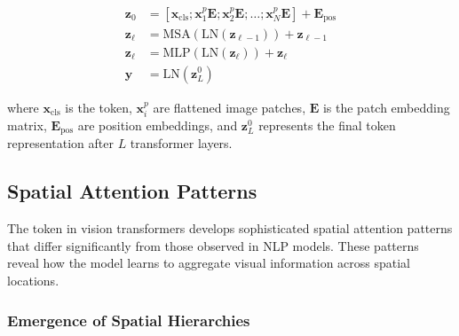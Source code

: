 \begin{align}
\mathbf{z}_0 &= [\mathbf{x}_{\text{cls}}; \mathbf{x}_1^p\mathbf{E}; \mathbf{x}_2^p\mathbf{E}; \ldots; \mathbf{x}_N^p\mathbf{E}] + \mathbf{E}_{\text{pos}} \\
\mathbf{z}_\ell &= \text{MSA}(\text{LN}(\mathbf{z}_{\ell-1})) + \mathbf{z}_{\ell-1} \\
\mathbf{z}_\ell &= \text{MLP}(\text{LN}(\mathbf{z}_\ell)) + \mathbf{z}_\ell \\
\mathbf{y} &= \text{LN}(\mathbf{z}_L^0)
\end{align}
\begin{comment}
Feedback: These equations are dense for non-experts. A brief, intuitive walkthrough would be very helpful. For example:
"Let's break this down:
1. The first line shows the input preparation: the special [CLS] token is prepended to the sequence of embedded image patches, and all of them get a positional embedding.
2. The next two lines describe a standard transformer block: the sequence goes through multi-head self-attention (MSA) and a feed-forward network (MLP), with layer normalization (LN) and residual connections. This is repeated for L layers.
3. The final line shows that for classification, we take only the output corresponding to the [CLS] token from the final layer (z_L^0), normalize it, and pass it to the classifier head. The representations of all the image patches are discarded."
\end{comment}

where $\mathbf{x}_{\text{cls}}$ is the \cls{} token, $\mathbf{x}_i^p$ are flattened image patches, $\mathbf{E}$ is the patch embedding matrix, $\mathbf{E}_{\text{pos}}$ are position embeddings, and $\mathbf{z}_L^0$ represents the final \cls{} token representation after $L$ transformer layers.

\subsection{Spatial Attention Patterns}

The \cls{} token in vision transformers develops sophisticated spatial attention patterns that differ significantly from those observed in NLP models. These patterns reveal how the model learns to aggregate visual information across spatial locations.

\subsubsection{Emergence of Spatial Hierarchies}

